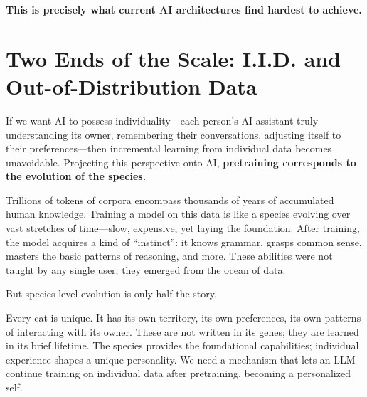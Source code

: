 \vspace{1em}

\textbf{This is precisely what current AI architectures find hardest to achieve.}

\newpage
\section{Two Ends of the Scale: I.I.D. and Out-of-Distribution Data}

If we want AI to possess individuality---each person's AI assistant truly understanding its owner, remembering their conversations, adjusting itself to their preferences---then incremental learning from individual data becomes unavoidable. Projecting this perspective onto AI, \textbf{pretraining corresponds to the evolution of the species.}

\vspace{1em}

Trillions of tokens of corpora encompass thousands of years of accumulated human knowledge. Training a model on this data is like a species evolving over vast stretches of time---slow, expensive, yet laying the foundation. After training, the model acquires a kind of ``instinct'': it knows grammar, grasps common sense, masters the basic patterns of reasoning, and more. These abilities were not taught by any single user; they emerged from the ocean of data.
\vspace{1em}

But species-level evolution is only half the story.

Every cat is unique. It has its own territory, its own preferences, its own patterns of interacting with its owner. These are not written in its genes; they are learned in its brief lifetime. The species provides the foundational capabilities; individual experience shapes a unique personality. We need a mechanism that lets an LLM continue training on individual data after pretraining, becoming a personalized self.




